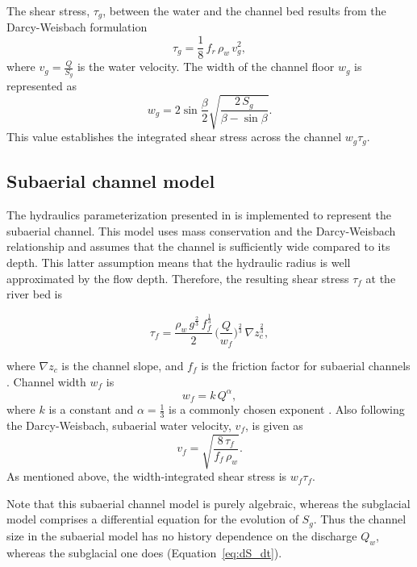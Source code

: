 \documentclass[esurf, manuscript]{copernicus}
\begin{document}
The shear stress, $\tau_g$, between the water and the channel bed results from the Darcy-Weisbach formulation
\begin{equation}
  \label{eq:tau_g}
  \tau_g=\frac{1}{8}\,f_r\,\rho_w\,v_g^2,
\end{equation}
% 
where $v_g = \frac{Q}{S_g}$ is the water velocity.
% 
The width of the channel floor $w_g$ is represented as
\begin{equation}
  \label{eq:dh2wc}
  w_g = 2  \sin \frac{\beta}{2} \sqrt{\frac{2\, S_g}{\beta -\sin \beta}}.
\end{equation}
% 
This value establishes the integrated shear stress across the channel $w_g\tau_g$.

\subsection{Subaerial channel  model}
\label{sect:fluv}

The hydraulics parameterization presented in \citet{tucker1997} is implemented to represent the subaerial channel.
This model uses mass conservation and the Darcy-Weisbach relationship and assumes that the channel is sufficiently wide compared to its depth.
This latter assumption means that the hydraulic radius is well approximated by the flow depth.
Therefore, the resulting shear stress $\tau_f$ at the river bed is
\begin{linenomath*}
  \begin{equation}
    \label{eq:DW_tau}
    \tau_f=\frac{\rho_w\,g^{\frac{2}{3}}\,f_f^{\frac{1}{3}}}{2}\, \Big(\frac{Q}{w_f} \Big)^{\frac{2}{3}} \,\nabla z_c^{\frac{2}{3}},
  \end{equation}
\end{linenomath*}
where $\nabla z_c$ is the channel slope, and $f_f$ is the friction factor for subaerial channels \citep{tucker1997}.
Channel width $w_f$ is
\begin{equation}
  \label{eq:wcf}
  w_f = k \, Q^{\alpha},
\end{equation}
% 
where $k$ is a constant and $\alpha=\frac{1}{3}$ is a commonly chosen exponent \citep{leopold1953}.
Also following the Darcy-Weisbach, subaerial water velocity, $v_f$, is given as
\begin{equation}
  \label{eq:vf}
  v_f = \sqrt{\frac{8\,\tau_f}{f_f\,\rho_w}}.
\end{equation}
% 
As mentioned above, the width-integrated shear stress is $w_f\tau_f$.

Note that this subaerial channel model is purely algebraic, whereas the subglacial model comprises a differential equation for the evolution of $S_g$.
Thus the channel size in the subaerial model has no history dependence on the discharge $Q_w$, whereas the subglacial one does (Equation~\ref{eq:dS_dt}).
\end{document}
